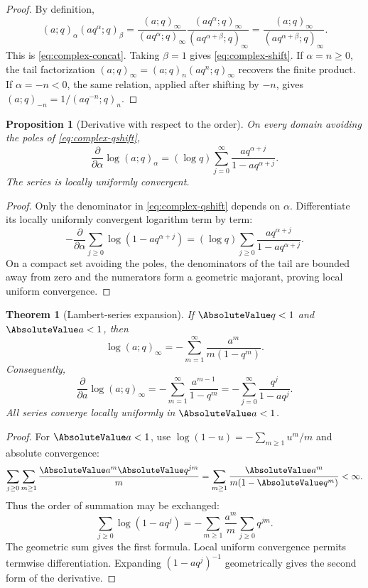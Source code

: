 \documentclass[11pt,a4paper,oneside,openany]{book}
\newtheorem{theorem}{Theorem}[chapter]
\newtheorem{proposition}[proposition]{Proposition}
\theoremstyle{definition}
\theoremstyle{remark}
\begin{document}
\begin{proof}
By definition,
\[
 (a;q)_\alpha(aq^\alpha;q)_\beta
 =\frac{(a;q)_\infty}{(aq^\alpha;q)_\infty}
  \frac{(aq^\alpha;q)_\infty}{(aq^{\alpha+\beta};q)_\infty}
 =\frac{(a;q)_\infty}{(aq^{\alpha+\beta};q)_\infty}.
\]
This is \eqref{eq:complex-concat}.  Taking $\beta=1$ gives \eqref{eq:complex-shift}.  If $\alpha=n\ge0$, the tail factorization
\(
 (a;q)_\infty=(a;q)_n(aq^n;q)_\infty
\)
recovers the finite product.  If $\alpha=-n<0$, the same relation, applied after shifting by $-n$, gives
\(
 (a;q)_{-n}=1/(aq^{-n};q)_n.
\)
\end{proof}

\begin{proposition}[Derivative with respect to the order]\label{prop:order-derivative}
On every domain avoiding the poles of \eqref{eq:complex-qshift},
\[
 \frac{\partial}{\partial\alpha}\log(a;q)_\alpha
 =(\log q)\sum_{j=0}^{\infty}
 \frac{aq^{\alpha+j}}{1-aq^{\alpha+j}}.
 \tag{1.4}\label{eq:order-derivative}
\]
The series is locally uniformly convergent.
\end{proposition}

\begin{proof}
Only the denominator in \eqref{eq:complex-qshift} depends on $\alpha$.  Differentiate its locally uniformly convergent logarithm term by term:
\[
 -\frac{\partial}{\partial\alpha}
 \sum_{j\ge0}\log(1-aq^{\alpha+j})
 =(\log q)\sum_{j\ge0}
 \frac{aq^{\alpha+j}}{1-aq^{\alpha+j}}.
\]
On a compact set avoiding the poles, the denominators of the tail are bounded away from zero and the numerators form a geometric majorant, proving local uniform convergence.
\end{proof}

\begin{theorem}[Lambert-series expansion]\label{thm:lambert-log}
If $\AbsoluteValue q<1$ and $\AbsoluteValue a<1$, then
\[
 \log(a;q)_\infty
 =-\sum_{m=1}^{\infty}\frac{a^m}{m(1-q^m)}.
\]
Consequently,
\[
 \frac{\partial}{\partial a}\log(a;q)_\infty
 =-\sum_{m=1}^{\infty}\frac{a^{m-1}}{1-q^m}
 =-\sum_{j=0}^{\infty}\frac{q^j}{1-aq^j}.
\]
All series converge locally uniformly in $\AbsoluteValue a<1$.
\end{theorem}

\begin{proof}
For $\AbsoluteValue a<1$, use $\log(1-u)=-\sum_{m\ge1}u^m/m$ and absolute convergence:
\[
 \sum_{j\ge0}\sum_{m\ge1}\frac{\AbsoluteValue a^m\AbsoluteValue q^{jm}}{m}
 =\sum_{m\ge1}\frac{\AbsoluteValue a^m}{m(1-\AbsoluteValue q^m)}<\infty.
\]
Thus the order of summation may be exchanged:
\[
 \sum_{j\ge0}\log(1-aq^j)
 =-\sum_{m\ge1}\frac{a^m}{m}\sum_{j\ge0}q^{jm}.
\]
The geometric sum gives the first formula.  Local uniform convergence permits termwise differentiation.  Expanding $(1-aq^j)^{-1}$ geometrically gives the second form of the derivative.
\end{proof}
\end{document}
